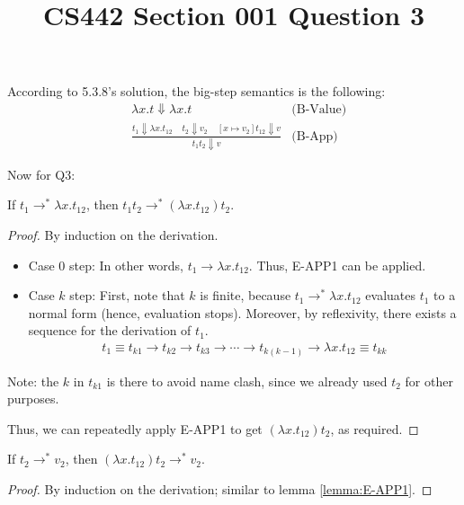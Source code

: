 \documentclass[12pt]{article}
\title{CS442 Section 001 Question 3}
\begin{document}
\maketitle

According to 5.3.8's solution, the big-step semantics is the following:
\begin{align*}
& \lambda x . t \Downarrow \lambda x . t & \text{(B-Value)} \\
& \frac{t_1 \Downarrow \lambda x . t_{12} \;\;\;\; t_2 \Downarrow v_2 \;\;\;\; [x \mapsto v_2] t_{12} \Downarrow v} {t_1t_2 \Downarrow v} & \text{(B-App)}
\end{align*}

Now for Q3:
\begin{lemma}
\label{lemma:E-APP1}
If $t_1 \rightarrow^* \lambda x . t_{12}$, then $t_1t_2 \rightarrow^* (\lambda x . t_{12}) t_2$.
\end{lemma}
\begin{proof}
By induction on the derivation.
\begin{itemize}
\item
Case 0 step:
In other words, $t_1 \rightarrow \lambda x . t_{12}$.
Thus, E-APP1 can be applied.
\item
Case $k$ step:
First, note that $k$ is finite, because $t_1 \rightarrow^* \lambda x . t_{12}$ evaluates $t_1$ to a normal form (hence, evaluation stops).
Moreover, by reflexivity, there exists a sequence for the derivation of $t_1$.
\begin{align*}
t_1 \equiv t_{k1} \rightarrow t_{k2} \rightarrow t_{k3} \rightarrow \cdots \rightarrow t_{k(k-1)} \rightarrow \lambda x . t_{12} \equiv t_{kk}
\end{align*}
\end{itemize}
Note: the $k$ in $t_{k1}$ is there to avoid name clash, since we already used $t_2$ for other purposes.

Thus, we can repeatedly apply E-APP1 to get $(\lambda x . t_{12}) t_2$, as required.
\end{proof}
\begin{lemma}
\label{lemma:E-APP2}
If $t_2 \rightarrow^* v_2$, then $(\lambda x . t_{12}) t_2 \rightarrow^* v_2$.
\end{lemma}
\begin{proof}
By induction on the derivation; similar to lemma \ref{lemma:E-APP1}.
\end{proof}
\end{document}
